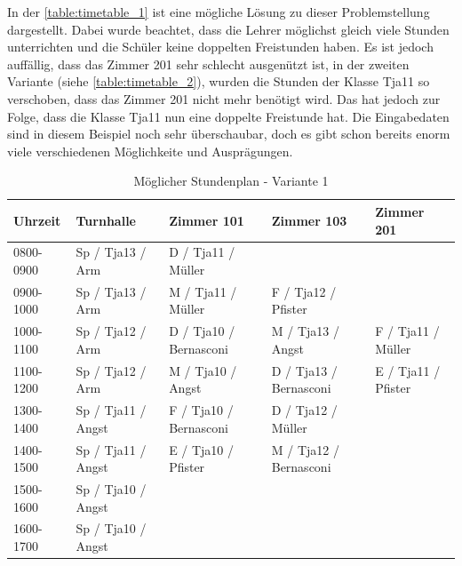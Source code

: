 \FloatBarrier
In der \autoref{table:timetable_1} ist eine mögliche Lösung zu dieser Problemstellung dargestellt. Dabei wurde beachtet, dass die Lehrer möglichst gleich viele Stunden unterrichten und die 
Schüler keine doppelten Freistunden haben. Es ist jedoch auffällig, dass das Zimmer 201 sehr schlecht ausgenützt ist, in der zweiten Variante (siehe \autoref{table:timetable_2}), wurden die 
Stunden der Klasse Tja11 so verschoben, dass das Zimmer 201 nicht mehr benötigt wird. Das hat jedoch zur Folge, dass die Klasse Tja11 nun eine doppelte Freistunde hat. Die Eingabedaten 
sind in diesem Beispiel noch sehr überschaubar, doch es gibt schon bereits enorm viele verschiedenen Möglichkeite und Ausprägungen.

\begin{table}[ht]
\centering
  \begin{tabular}{ l | l | l | l | l }
	\hline
	\rowcolor{gray}
	\textbf{Uhrzeit} 	& \textbf{Turnhalle}	& \textbf{Zimmer 101} 	& \textbf{Zimmer 103}	&  \textbf{Zimmer 201}\\ \hline
	0800-0900		& Sp / Tja13 / Arm		& D / Tja11 / Müller		& 				& \\ \hline
	0900-1000		& Sp / Tja13 / Arm		& M / Tja11 / Müller		& F / Tja12 / Pfister		& \\ \hline
	1000-1100		& Sp / Tja12 / Arm		& D / Tja10 / Bernasconi	& M / Tja13 / Angst		& F / Tja11 / Müller\\ \hline
	1100-1200		& Sp / Tja12 / Arm		& M / Tja10 / Angst		& D / Tja13 / Bernasconi	& E / Tja11 / Pfister\\ \hline \hline
	1300-1400		& Sp / Tja11 / Angst	& F / Tja10 / Bernasconi	& D / Tja12 / Müller		& \\ \hline
	1400-1500		& Sp / Tja11 / Angst	& E / Tja10 / Pfister		& M / Tja12 / Bernasconi	& \\ \hline
	1500-1600		& Sp / Tja10 / Angst	& 				& 				& \\ \hline
	1600-1700		& Sp / Tja10 / Angst	& 				& 				& \\ \hline
  \end{tabular}
   \caption{Möglicher Stundenplan - Variante 1}\label{table:timetable_1}
\end{table}

